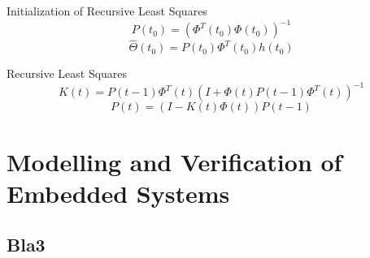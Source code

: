 Initialization of Recursive Least Squares
\begin{equation}
	P(t_0) = \left( \Phi^T(t_0) \Phi(t_0) \right)^{-1}
\end{equation}
\begin{equation}
	\hat \Theta (t_0) = P(t_0) \Phi^T(t_0) h(t_0)
\end{equation}

Recursive Least Squares
\begin{equation}
	K(t) = P(t-1) \Phi^T(t) (I + \Phi(t) P(t - 1) \Phi^T(t))^{-1}
\end{equation}
\begin{equation}
	P(t) = (I - K(t) \Phi(t)) P(t - 1)
\end{equation}

\chapter{Modelling and Verification of Embedded Systems}

\section{Bla3}
\label{sec:bla3}
\lipsum[1] 
